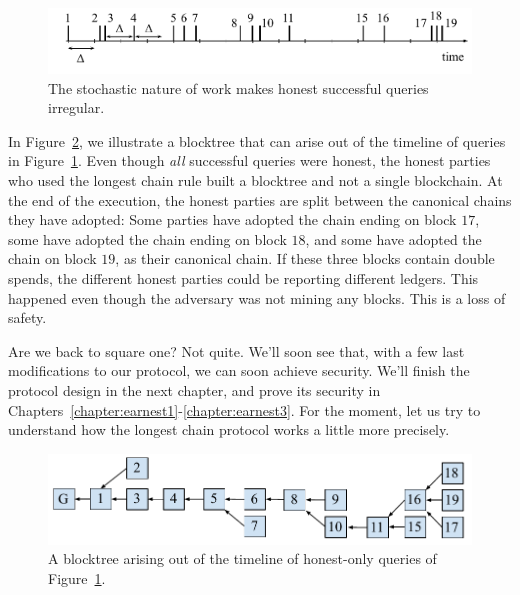 \begin{figure}[h]
    \centering
    \includegraphics[width=0.8 \columnwidth,keepaspectratio]{figures/stochastic-queries.pdf}
    \caption{The stochastic nature of work makes honest successful queries irregular.}
    \label{fig.stochastic-queries}
\end{figure}

In Figure~\ref{fig.honest-chain-fork}, we illustrate a
blocktree that can arise out of the timeline of queries in Figure~\ref{fig.stochastic-queries}.
Even though \emph{all} successful queries were honest, the honest parties who used the longest
chain rule built a blocktree and not a single blockchain. At the end of the execution, the honest
parties are split between the canonical chains they have adopted: Some parties have adopted
the chain ending on block $17$, some have adopted the chain ending on block $18$, and some have
adopted the chain on block $19$, as their canonical chain. If these three blocks contain double
spends, the different honest parties could be reporting different ledgers. This happened even
though the adversary was not mining any blocks. This is a loss of safety.

Are we back to square one? Not quite. We'll soon see that, with a few last modifications to
our protocol, we can soon achieve security. We'll finish the protocol design in the next chapter,
and prove its security in Chapters~\ref{chapter:earnest1}-\ref{chapter:earnest3}. For the moment,
let us try to understand how the longest chain protocol works a little more precisely.

\begin{figure}[h]
    \centering
    \includegraphics[width=0.8 \columnwidth,keepaspectratio]{figures/honest-chain-fork.pdf}
    \caption{A blocktree arising out of the timeline of honest-only queries of Figure~\ref{fig.stochastic-queries}.}
    \label{fig.honest-chain-fork}
\end{figure}

